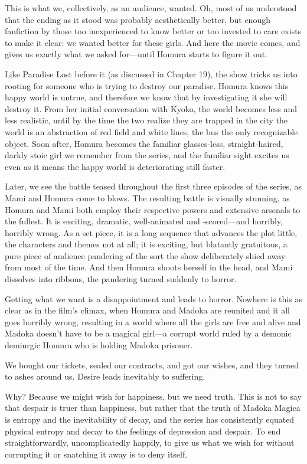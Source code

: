 This is what we, collectively, as an audience, wanted. Oh, most of us understood that the ending as it stood was probably aesthetically better, but enough fanfiction by those too inexperienced to know better or too invested to care exists to make it clear: we wanted better for these girls. And here the movie comes, and gives us exactly what we asked for—until Homura starts to figure it out. 

Like Paradise Lost before it (as discussed in Chapter 19), the show tricks us into rooting for someone who is trying to destroy our paradise. Homura knows this happy world is untrue, and therefore we know that by investigating it she will destroy it. From her initial conversation with Kyoko, the world becomes less and less realistic, until by the time the two realize they are trapped in the city the world is an abstraction of red field and white lines, the bus the only recognizable object. Soon after, Homura becomes the familiar glasses-less, straight-haired, darkly stoic girl we remember from the series, and the familiar sight excites us even as it means the happy world is deteriorating still faster. 

Later, we see the battle teased throughout the first three episodes of the series, as Mami and Homura come to blows. The resulting battle is visually stunning, as Homura and Mami both employ their respective powers and extensive arsenals to the fullest. It is exciting, dramatic, well-animated and -scored—and horribly, horribly wrong. As a set piece, it is a long sequence that advances the plot little, the characters and themes not at all; it is exciting, but blatantly gratuitous, a pure piece of audience pandering of the sort the show deliberately shied away from most of the time. And then Homura shoots herself in the head, and Mami dissolves into ribbons, the pandering turned suddenly to horror. 

Getting what we want is a disappointment and leads to horror. Nowhere is this as clear as in the film's climax, when Homura and Madoka are reunited and it all goes horribly wrong, resulting in a world where all the girls are free and alive and Madoka doesn't have to be a magical girl—a corrupt world ruled by a demonic demiurgic Homura who is holding Madoka prisoner. 

We bought our tickets, sealed our contracts, and got our wishes, and they turned to ashes around us. Desire leads inevitably to suffering. 

Why? Because we might wish for happiness, but we need truth. This is not to say that despair is truer than happiness, but rather that the truth of Madoka Magica is entropy and the inevitability of decay, and the series has consistently equated physical entropy and decay to the feelings of depression and despair. To end straightforwardly, uncomplicatedly happily, to give us what we wish for without corrupting it or snatching it away is to deny itself. 

